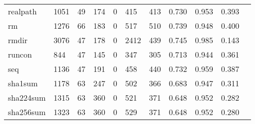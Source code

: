 \begin{longtable}{lp{1.10cm}p{1.10cm}p{1.10cm}p{1.10cm}p{1.10cm}p{1.10cm}p{1.10cm}p{1.10cm}p{1.10cm}p{1.10cm}}
realpath  &                   1051 &                                 49 &                               174 &                                0 &                               415 &                             413 &                             0.730 &                                 0.953 &                               0.393 \\
rm        &                   1276 &                                 66 &                               183 &                                0 &                               517 &                             510 &                             0.739 &                                 0.948 &                               0.400 \\
rmdir     &                   3076 &                                 47 &                               178 &                                0 &                              2412 &                             439 &                             0.745 &                                 0.985 &                               0.143 \\
runcon    &                    844 &                                 47 &                               145 &                                0 &                               347 &                             305 &                             0.713 &                                 0.944 &                               0.361 \\
seq       &                   1136 &                                 47 &                               191 &                                0 &                               458 &                             440 &                             0.732 &                                 0.959 &                               0.387 \\
sha1sum   &                   1178 &                                 63 &                               247 &                                0 &                               502 &                             366 &                             0.683 &                                 0.947 &                               0.311 \\
sha224sum &                   1315 &                                 63 &                               360 &                                0 &                               521 &                             371 &                             0.648 &                                 0.952 &                               0.282 \\
sha256sum &                   1323 &                                 63 &                               360 &                                0 &                               529 &                             371 &                             0.648 &                                 0.952 &                               0.280 \\

\end{longtable}
